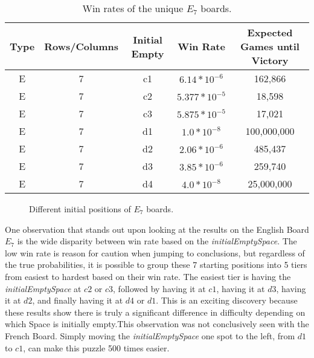 \documentclass{article}
\begin{document}
\begin{table}[htb]
\begin{center} 
\begin{tabular}{ c  c  c  c  c }
\hline
\textbf{Type} & \textbf{Rows/Columns} &\textbf{Initial Empty} & \textbf{Win Rate} & \textbf{Expected Games until Victory}\\
\hline
E & 7 & c1 & $6.14*10^{-6}$ & 162,866\\

E & 7 & c2 & $5.377*10^{-5}$ & 18,598\\

E & 7 & c3 & $5.875*10^{-5}$ & 17,021\\

E & 7 & d1 & $1.0*10^{-8}$ & 100,000,000\\

E & 7 & d2 & $2.06*10^{-6}$& 485,437\\

E & 7 & d3 & $3.85*10^{-6}$ & 259,740\\

E & 7 & d4 & $4.0*10^{-8}$ & 25,000,000\\
\end{tabular}
\caption{Win rates of the unique $E_7$ boards.}
\label{tab2}
\end{center} 
\end{table}

\begin{figure}[htb]
\centering
{}
\caption{Different initial positions of $E_7$ boards.}
\label{fig7}
\end{figure} 

One observation that stands out upon looking at the results on the English Board $E_7$ is the wide disparity between win rate based on the \textit{initialEmptySpace}. The low win rate is reason for caution when jumping to conclusions, but regardless of the true probabilities, it is possible to group these 7 starting positions into 5 tiers from easiest to hardest based on their win rate. The easiest tier is having the \textit{initialEmptySpace}  at $c2$ or $c3$, followed by having it at $c1$, having it at $d3$, having it at $d2$, and finally having it at $d4$ or $d1$. This is an exciting discovery because these results show there is truly a significant difference in difficulty depending on which Space is initially empty.This observation was not conclusively seen with the French Board. Simply moving the \textit{initialEmptySpace} one spot to the left, from $d1$ to $c1$, can make this puzzle 500 times easier.
\end{document}
